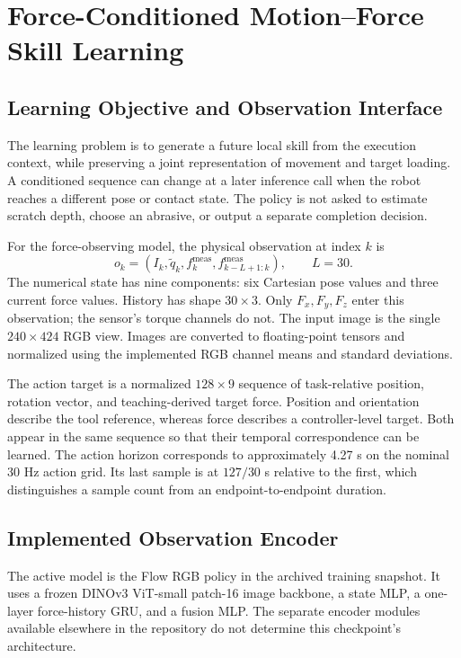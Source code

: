 \chapter{Force-Conditioned Motion--Force Skill Learning}
\label{chap:force_il}

\section{Learning Objective and Observation Interface}
The learning problem is to generate a future local skill from the execution context, while preserving a joint representation of movement and target loading. A conditioned sequence can change at a later inference call when the robot reaches a different pose or contact state. The policy is not asked to estimate scratch depth, choose an abrasive, or output a separate completion decision.

For the force-observing model, the physical observation at index \(k\) is
\begin{equation}
 o_k=\left(I_k,\widetilde q_k,f_k^{\mathrm{meas}},
       f_{k-L+1:k}^{\mathrm{meas}}\right),\qquad L=30.
 \label{eq:il_observation}
\end{equation}
The numerical state has nine components: six Cartesian pose values and three current force values. History has shape \(30\times3\). Only \(F_x,F_y,F_z\) enter this observation; the sensor's torque channels do not. The input image is the single \(240\times424\) RGB view. Images are converted to floating-point tensors and normalized using the implemented RGB channel means and standard deviations.

The action target is a normalized \(128\times9\) sequence of task-relative position, rotation vector, and teaching-derived target force. Position and orientation describe the tool reference, whereas force describes a controller-level target. Both appear in the same sequence so that their temporal correspondence can be learned. The action horizon corresponds to approximately 4.27 s on the nominal 30 Hz action grid. Its last sample is at \(127/30\) s relative to the first, which distinguishes a sample count from an endpoint-to-endpoint duration.

\section{Implemented Observation Encoder}
The active model is the Flow RGB policy in the archived training snapshot. It uses a frozen DINOv3 ViT-small patch-16 image backbone, a state MLP, a one-layer force-history GRU, and a fusion MLP. The separate encoder modules available elsewhere in the repository do not determine this checkpoint's architecture.

